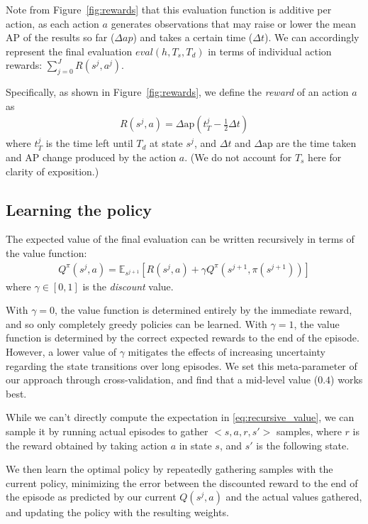 Note from Figure~\ref{fig:rewards} that this evaluation function is additive per action, as each action $a$ generates observations that may raise or lower the mean AP of the results so far ($\Delta ap$) and takes a certain time ($\Delta t$).
We can accordingly represent the final evaluation $eval(h,T_s,T_d)$ in terms of individual action rewards: $\sum_{j=0}^J R(s^j,a^j)$.

Specifically, as shown in Figure~\ref{fig:rewards}, we define the \emph{reward} of an action $a$ as
\begin{align}\label{eq:advanced}
R(s^j,a) = \Delta \text{ap} (t_T^j-\frac{1}{2}\Delta t)
\end{align}
where $t_T^j$ is the time left until $T_d$ at state $s^j$, and $\Delta t$ and $\Delta \text{ap}$ are the time taken and AP change produced by the action $a$.
(We do not account for $T_s$ here for clarity of exposition.)

\subsection{Learning the policy}
The expected value of the final evaluation can be written recursively in terms of the value function:
\begin{align} \label{eq:recursive_value}
Q^\pi(s^j,a) = \mathbb{E}_{s^{j+1}} [R(s^j,a) + \gamma Q^\pi(s^{j+1},\pi(s^{j+1}))]
\end{align}
where $\gamma \in [0,1]$ is the \emph{discount} value.

With $\gamma=0$, the value function is determined entirely by the immediate reward, and so only completely greedy policies can be learned.
With $\gamma=1$, the value function is determined by the correct expected rewards to the end of the episode.
However, a lower value of $\gamma$ mitigates the effects of increasing uncertainty regarding the state transitions over long episodes. %
We set this meta-parameter of our approach through cross-validation, and find that a mid-level value ($0.4$) works best.

While we can't directly compute the expectation in \eqref{eq:recursive_value}, we can sample it by running actual episodes to gather $<s,a,r,s'>$ samples, where $r$ is the reward obtained by taking action $a$ in state $s$, and $s'$ is the following state.

We then learn the optimal policy by repeatedly gathering samples with the current policy, minimizing the error between the discounted reward to the end of the episode as predicted by our current $Q(s^j,a)$ and the actual values gathered, and updating the policy with the resulting weights.

